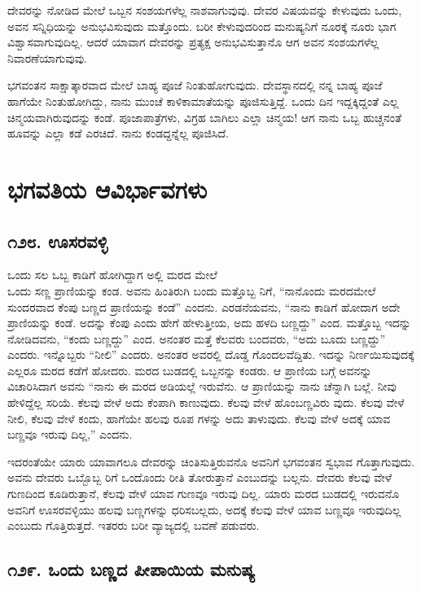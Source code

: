 ದೇವರನ್ನು ನೋಡಿದ ಮೇಲೆ ಒಬ್ಬನ ಸಂಶಯಗಳೆಲ್ಲ ನಾಶವಾಗುವುವು. ದೇವರ ವಿಷಯವನ್ನು ಕೇಳುವುದು ಒಂದು, ಅವನ ಸನ್ನಿಧಿಯನ್ನು ಅನುಭವಿಸುವುದು ಮತ್ತೊಂದು. ಬರೀ ಕೇಳುವುದರಿಂದ ಮನುಷ್ಯನಿಗೆ ನೂರಕ್ಕೆ ನೂರು ಭಾಗ ವಿಶ್ವಾಸವಾಗುವುದಿಲ್ಲ. ಆದರೆ ಯಾವಾಗ ದೇವರನ್ನು ಪ್ರತ್ಯಕ್ಷ ಅನುಭವಿಸುತ್ತಾನೊ ಆಗ ಅವನ ಸಂಶಯಗಳೆಲ್ಲ ನಿವಾರಣೆಯಾಗುವುವು.

ಭಗವಂತನ ಸಾಕ್ಷಾತ್ಕಾರವಾದ ಮೇಲೆ ಬಾಹ್ಯ ಪೂಜೆ ನಿಂತುಹೋಗುವುದು. ದೇವಸ್ಥಾನದಲ್ಲಿ ನನ್ನ ಬಾಹ್ಯ ಪೂಜೆ ಹಾಗೆಯೇ ನಿಂತುಹೋಗಿದ್ದು, ನಾನು ಮುಂಚೆ ಕಾಳಿಕಾಮಾತೆಯನ್ನು ಪೂಜಿಸುತ್ತಿದ್ದೆ. ಒಂದು ದಿನ ಇದ್ದಕ್ಕಿದ್ದಂತೆ ಎಲ್ಲ ಚಿನ್ಮಯವಾಗಿರುವುದನ್ನು ಕಂಡೆ. ಪೂಜಾಪಾತ್ರೆಗಳು, ವಿಗ್ರಹ ಬಾಗಿಲು ಎಲ್ಲಾ ಚಿನ್ಮಯ! ಆಗ ನಾನು ಒಬ್ಬ ಹುಚ್ಚನಂತೆ ಹೂವನ್ನು ಎಲ್ಲಾ ಕಡೆ ಎರಚಿದೆ. ನಾನು ಕಂಡದ್ದನ್ನೆಲ್ಲ ಪೂಜಿಸಿದೆ.

\chapter{ಭಗವತಿಯ ಆವಿರ್ಭಾವಗಳು}

\section{\num{೧೨೮. } ಊಸರವಳ್ಳಿ}

ಒಂದು ಸಲ ಒಬ್ಬ ಕಾಡಿಗೆ ಹೋಗಿದ್ದಾಗ ಅಲ್ಲಿ ಮರದ ಮೇಲೆ\\ಒಂದು ಸಣ್ಣ ಪ್ರಾಣಿಯನ್ನು ಕಂಡ. ಅವನು ಹಿಂತಿರುಗಿ ಬಂದು ಮತ್ತೊಬ್ಬ ನಿಗೆ, “ನಾನೊಂದು ಮರದಮೇಲೆ ಸುಂದರವಾದ ಕೆಂಪು ಬಣ್ಣದ ಪ್ರಾಣಿಯನ್ನು ಕಂಡೆ” ಎಂದನು. ಎರಡನೆಯವನು, “ನಾನು ಕಾಡಿಗೆ ಹೋದಾಗ ಅದೇ ಪ್ರಾಣಿಯನ್ನು ಕಂಡೆ. ಅದನ್ನು ಕೆಂಪು ಎಂದು ಹೇಗೆ ಹೇಳುತ್ತೀಯ, ಅದು ಹಳದಿ ಬಣ್ಣದ್ದು” ಎಂದ. ಮತ್ತೊಬ್ಬ ಇದನ್ನು ನೋಡಿದವನು, “ಕಂದು ಬಣ್ಣದ್ದು” ಎಂದ. ಅನಂತರ ಮತ್ತೆ ಕೆಲವರು ಬಂದವರು, “ಅದು ಬೂದು ಬಣ್ಣದ್ದು” ಎಂದರು. ಇನ್ನೊಬ್ಬರು “ನೀಲಿ” ಎಂದರು. ಅನಂತರ ಅವರಲ್ಲಿ ದೊಡ್ಡ ಗೊಂದಲವೆದ್ದಿತು. ಇದನ್ನು ನಿರ್ಣಯಿಸುವುದಕ್ಕೆ ಎಲ್ಲರೂ ಮರದ ಕಡೆಗೆ ಹೋದರು. ಮರದ ಬುಡದಲ್ಲಿ ಒಬ್ಬನನ್ನು ಕಂಡರು. ಆ ಪ್ರಾಣಿಯ ಬಗ್ಗೆ ಅವನನ್ನು ವಿಚಾರಿಸಿದಾಗ ಅವನು “ನಾನು ಈ ಮರದ ಅಡಿಯಲ್ಲೆ ಇರುವೆನು. ಆ ಪ್ರಾಣಿಯನ್ನು ನಾನು ಚೆನ್ನಾಗಿ ಬಲ್ಲೆ. ನೀವು ಹೇಳಿದ್ದೆಲ್ಲ ಸರಿಯೆ. ಕೆಲವು ವೇಳೆ ಅದು ಕೆಂಪಾಗಿ ಕಾಣುವುದು. ಕೆಲವು ವೇಳೆ ಹೊಂಬಣ್ಣವಿರು ವುದು. ಕೆಲವು ವೇಳೆ ನೀಲಿ, ಕೆಲವು ವೇಳೆ ಕಂದು, ಹಾಗೆಯೇ ಹಲವು ರೂಪ ಗಳನ್ನು ಅದು ತಾಳುವುದು. ಕೆಲವು ವೇಳೆ ಅದಕ್ಕೆ ಯಾವ ಬಣ್ಣವೂ ಇರುವು ದಿಲ್ಲ,” ಎಂದನು.

ಇದರಂತೆಯೇ ಯಾರು ಯಾವಾಗಲೂ ದೇವರನ್ನು ಚಿಂತಿಸುತ್ತಿರುವನೊ ಅವನಿಗೆ ಭಗವಂತನ ಸ್ವಭಾವ ಗೊತ್ತಾಗುವುದು. ಅವನು ದೇವರು ಒಬ್ಬೊಬ್ಬ ರಿಗೆ ಒಂದೊಂದು ರೀತಿ ತೋರುತ್ತಾನೆ ಎಂಬುದನ್ನು ಬಲ್ಲನು. ದೇವರು ಕೆಲವು ವೇಳೆ ಗುಣದಿಂದ ಕೂಡಿರುತ್ತಾನೆ, ಕೆಲವು ವೇಳೆ ಯಾವ ಗುಣವೂ ಇರುವು ದಿಲ್ಲ. ಯಾರು ಮರದ ಬುಡದಲ್ಲಿ ಇರುವನೊ ಅವನಿಗೆ ಊಸರವಳ್ಳಿಯು ಹಲವು ಬಣ್ಣಗಳನ್ನು ಧರಿಸಬಲ್ಲದು, ಅದಕ್ಕೆ ಕೆಲವು ವೇಳೆ ಯಾವ ಬಣ್ಣವೂ ಇರುವುದಿಲ್ಲ ಎಂಬುದು ಗೊತ್ತಿರುತ್ತದೆ. ಇತರರು ಬರೀ ವ್ಯಾಜ್ಯದಲ್ಲಿ ಬವಣೆ ಪಡುವರು.


\section{\num{೧೨೯. } ಒಂದು ಬಣ್ಣದ ಪೀಪಾಯಿಯ ಮನುಷ್ಯ}

